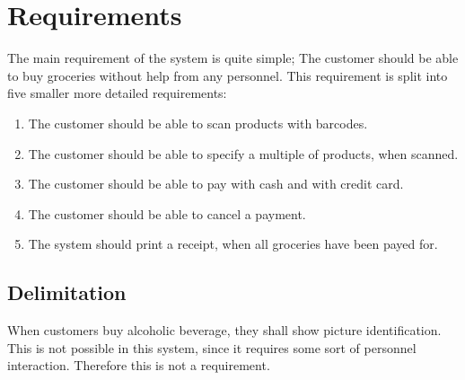 \chapter{Requirements}
The main requirement of the system is quite simple; The customer should be able to buy groceries without help from any personnel. This requirement is split into five smaller more detailed requirements:

\begin{enumerate}[label=R.\arabic*:]
\item The customer should be able to scan products with barcodes.
\item The customer should be able to specify a multiple of products, when scanned.
\item The customer should be able to pay with cash and with credit card.
\item The customer should be able to cancel a payment.
\item The system should print a receipt, when all groceries have been payed for.
\end{enumerate}

\section{Delimitation}
When customers buy alcoholic beverage, they shall show picture identification. This is not possible in this system, since it requires some sort of personnel interaction. Therefore this is not a requirement.
